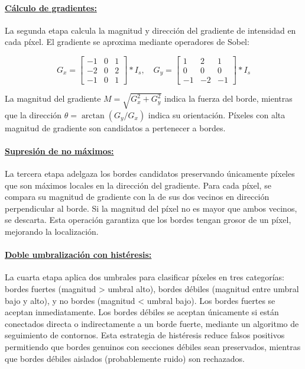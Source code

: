 \paragraph{\underline{Cálculo de gradientes:}}

La segunda etapa calcula la magnitud y dirección del gradiente de intensidad en cada píxel. El gradiente se aproxima mediante operadores de Sobel:

\begin{equation}
G_x = \begin{bmatrix} -1 & 0 & 1 \\ -2 & 0 & 2 \\ -1 & 0 & 1 \end{bmatrix} \ast I_s, \quad G_y = \begin{bmatrix} 1 & 2 & 1 \\ 0 & 0 & 0 \\ -1 & -2 & -1 \end{bmatrix} \ast I_s
\end{equation}

La magnitud del gradiente $M = \sqrt{G_x^2 + G_y^2}$ indica la fuerza del borde, mientras que la dirección $\theta = \arctan(G_y/G_x)$ indica su orientación. Píxeles con alta magnitud de gradiente son candidatos a pertenecer a bordes.

\paragraph{\underline{Supresión de no máximos:}}

La tercera etapa adelgaza los bordes candidatos preservando únicamente píxeles que son máximos locales en la dirección del gradiente. Para cada píxel, se compara su magnitud de gradiente con la de sus dos vecinos en dirección perpendicular al borde. Si la magnitud del píxel no es mayor que ambos vecinos, se descarta. Esta operación garantiza que los bordes tengan grosor de un píxel, mejorando la localización.

\paragraph{\underline{Doble umbralización con histéresis:}}

La cuarta etapa aplica dos umbrales para clasificar píxeles en tres categorías: bordes fuertes (magnitud > umbral alto), bordes débiles (magnitud entre umbral bajo y alto), y no bordes (magnitud < umbral bajo). Los bordes fuertes se aceptan inmediatamente. Los bordes débiles se aceptan únicamente si están conectados directa o indirectamente a un borde fuerte, mediante un algoritmo de seguimiento de contornos. Esta estrategia de histéresis reduce falsos positivos permitiendo que bordes genuinos con secciones débiles sean preservados, mientras que bordes débiles aislados (probablemente ruido) son rechazados.

